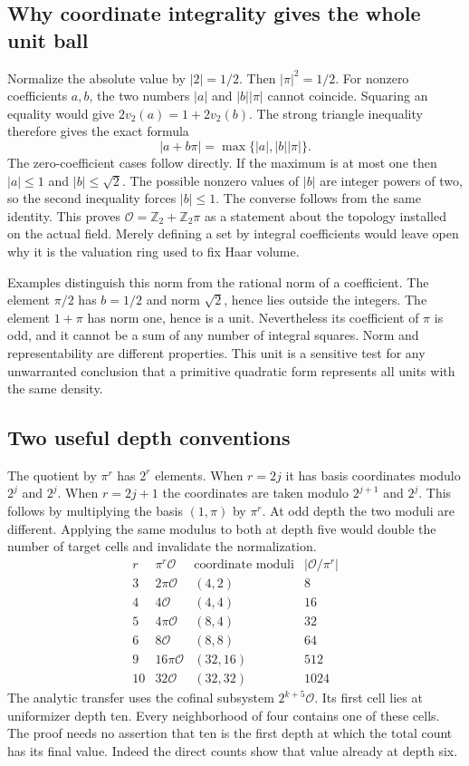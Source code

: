 \documentclass[12pt,letterpaper]{article}
\begin{document}
\subsection{Why coordinate integrality gives the whole unit ball}
Normalize the absolute value by $|2|=1/2$. Then $|\pi|^2=1/2$. For nonzero coefficients $a,b$, the two numbers $|a|$ and $|b||\pi|$ cannot coincide. Squaring an equality would give $2v_2(a)=1+2v_2(b)$. The strong triangle inequality therefore gives the exact formula
\[
       |a+b\pi|=\max\{|a|,|b||\pi|\}.
\]
The zero-coefficient cases follow directly. If the maximum is at most one then $|a|\leq1$ and $|b|\leq\sqrt2$. The possible nonzero values of $|b|$ are integer powers of two, so the second inequality forces $|b|\leq1$. The converse follows from the same identity. This proves $\mathcal O=\mathbb Z_2+\mathbb Z_2\pi$ as a statement about the topology installed on the actual field. Merely defining a set by integral coefficients would leave open why it is the valuation ring used to fix Haar volume.
\par
Examples distinguish this norm from the rational norm of a coefficient. The element $\pi/2$ has $b=1/2$ and norm $\sqrt2$, hence lies outside the integers. The element $1+\pi$ has norm one, hence is a unit. Nevertheless its coefficient of $\pi$ is odd, and it cannot be a sum of any number of integral squares. Norm and representability are different properties. This unit is a sensitive test for any unwarranted conclusion that a primitive quadratic form represents all units with the same density.
\subsection{Two useful depth conventions}
The quotient by $\pi^r$ has $2^r$ elements. When $r=2j$ it has basis coordinates modulo $2^j$ and $2^j$. When $r=2j+1$ the coordinates are taken modulo $2^{j+1}$ and $2^j$. This follows by multiplying the basis $(1,\pi)$ by $\pi^r$. At odd depth the two moduli are different. Applying the same modulus to both at depth five would double the number of target cells and invalidate the normalization.
\[
\begin{array}{c|c|c|c}
 r&\pi^r\mathcal O& \text{coordinate moduli}& |\mathcal O/\pi^r|\\\hline
 3&2\pi\mathcal O&(4,2)&8\\
 4&4\mathcal O&(4,4)&16\\
 5&4\pi\mathcal O&(8,4)&32\\
 6&8\mathcal O&(8,8)&64\\
 9&16\pi\mathcal O&(32,16)&512\\
 10&32\mathcal O&(32,32)&1024
\end{array}
\]
The analytic transfer uses the cofinal subsystem $2^{k+5}\mathcal O$. Its first cell lies at uniformizer depth ten. Every neighborhood of four contains one of these cells. The proof needs no assertion that ten is the first depth at which the total count has its final value. Indeed the direct counts show that value already at depth six.
\end{document}
